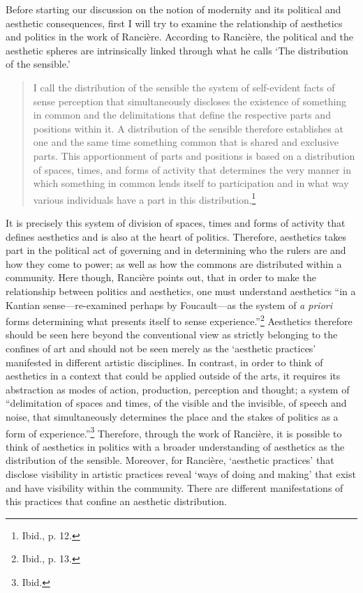 Before starting our discussion on the notion of modernity and its political and aesthetic consequences, first I will try to examine the relationship of aesthetics and politics in the work of Ranci\`{e}re. According to Ranci\`{e}re, the political and the aesthetic spheres are intrinsically linked through what he calls `The distribution of the sensible.' 
\begin{quote}
I call the distribution of the sensible the system of self-evident facts of sense perception that simultaneously discloses the existence of something in common and the delimitations that define the respective parts and positions within it. A distribution of the sensible therefore establishes at one and the same time something common that is shared and exclusive parts. This apportionment of parts and positions is based on a distribution of spaces, times, and forms of activity that determines the very manner in which something in common lends itself to participation and in what way various individuals have a part in this distribution.\footnote{Ibid., p. 12.}
\end{quote}
It is precisely this system of division of spaces, times and forms of activity that defines aesthetics and is also at the heart of politics. Therefore, aesthetics takes part in the political act of governing and in determining who the rulers are and how they come to power; as well as how the commons are distributed within a community. Here though, Ranci\`{e}re points out, that in order to make the relationship between politics and aesthetics, one must understand aesthetics ``in a Kantian sense---re-examined perhaps by Foucault---as the system of \emph{a priori} forms determining what presents itself to sense experience.''\footnote{Ibid., p. 13.} Aesthetics therefore should be seen here beyond the conventional view as strictly belonging to the confines of art and should not be seen merely as the `aesthetic practices' manifested in different artistic disciplines.  In contrast, in order to think of aesthetics in a context that could be applied outside of the arts, it requires its abstraction as modes of action, production, perception and thought; a system of ``delimitation of spaces and times, of the visible and the invisible, of speech and noise, that simultaneously determines the place and the stakes of politics as a form of experience.''\footnote{Ibid.}
Therefore, through the work of Ranci\`{e}re, it is possible to think of aesthetics in politics with a broader understanding of aesthetics as the distribution of the sensible. Moreover, for Ranci\`{e}re, `aesthetic practices' that disclose visibility in artistic practices reveal `ways of doing and making' that exist and have visibility within the community. There are different manifestations of this practices that confine an aesthetic distribution.

